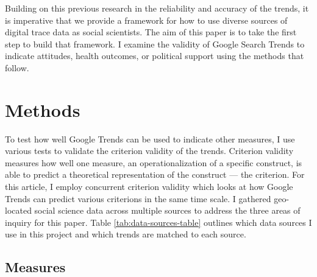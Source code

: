 Building on this previous research in the reliability and accuracy of the trends, 
it is imperative that we provide a framework for how to use diverse sources
of digital trace data as social scientists. The aim of this paper is
to take the first step to build that framework. I examine the validity of 
Google Search Trends to indicate attitudes, health outcomes, or political 
support using the methods that follow.

\section{Methods}

To test how well Google Trends can be used to indicate other measures, 
I use various tests to validate the criterion validity of the trends. 
Criterion validity measures how well one measure, an operationalization of a 
specific construct, is able to predict a theoretical representation 
of the construct — the criterion. For this article, I employ 
concurrent criterion validity which looks at how Google Trends can
predict various criterions in the same time scale. 
I gathered geo-located social science data across multiple
sources to address the three areas of inquiry for this paper.  Table
\ref{tab:data-sources-table} outlines which data sources I use in this
project and which trends are matched to each source.



\subsection{Measures}

